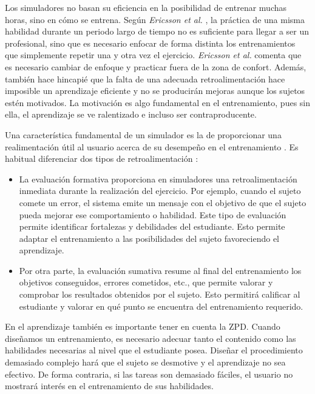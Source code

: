 Los simuladores no basan su eficiencia en la posibilidad de entrenar muchas horas, sino en cómo se entrena. Según \emph{Ericsson et al.} \cite{ericsson1993role}, la práctica de una misma habilidad durante un periodo largo de tiempo no es suficiente para llegar a ser un profesional, sino que es necesario enfocar de forma distinta los entrenamientos que simplemente repetir una y otra vez el ejercicio. \emph{Ericsson et al.} comenta que es necesario cambiar de enfoque y practicar fuera de la zona de confort. Además, también hace hincapié que la falta de una adecuada retroalimentación hace imposible un aprendizaje eficiente y no se producirán mejoras aunque los sujetos estén motivados. La motivación es algo fundamental en el entrenamiento, pues sin ella, el aprendizaje se ve ralentizado e incluso ser contraproducente. 

Una característica fundamental de un simulador es la de proporcionar una realimentación útil al usuario acerca de su desempeño en el entrenamiento \cite{ericsson1993role}. Es habitual diferenciar dos tipos de retroalimentación \cite{Sando2013}: 
\begin{itemize}
    \item La evaluación formativa proporciona en simuladores una retroalimentación inmediata durante la realización del ejercicio. Por ejemplo, cuando el sujeto comete un error, el sistema emite un mensaje con el objetivo de que el sujeto pueda mejorar ese comportamiento o habilidad. Este tipo de evaluación permite identificar fortalezas y debilidades del estudiante. Esto permite adaptar el entrenamiento a las posibilidades del sujeto favoreciendo el aprendizaje.
    \item Por otra parte, la evaluación sumativa resume al final del entrenamiento los objetivos conseguidos, errores cometidos, etc.,  que permite valorar y comprobar los resultados obtenidos por el sujeto. Esto permitirá calificar al estudiante y valorar en qué punto se encuentra del entrenamiento requerido.
\end{itemize}


En el aprendizaje también es importante tener en cuenta la \ac{ZPD}\cite{zpd}. Cuando diseñamos un entrenamiento, es necesario adecuar tanto el contenido como las habilidades necesarias al nivel que el estudiante posea. Diseñar el procedimiento demasiado complejo hará que el sujeto se desmotive y el aprendizaje no sea efectivo. De forma contraria, si las tareas son demasiado fáciles, el usuario no mostrará interés en el entrenamiento de sus habilidades.


